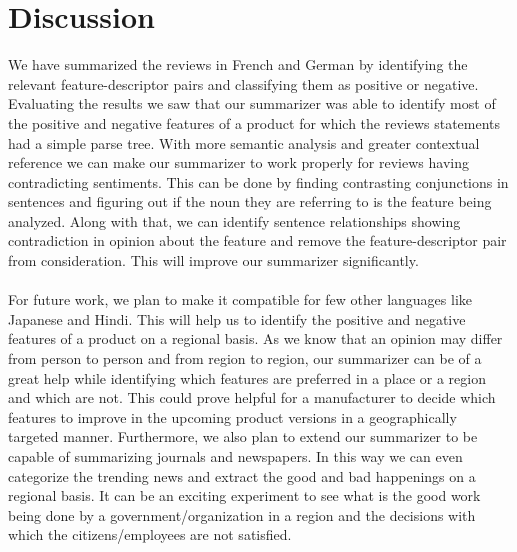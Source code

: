 \documentclass[conference]{IEEEtran}
\begin{document}
\section{\textbf{Discussion}}
\indent We have summarized the reviews in French and German by identifying the relevant feature-descriptor pairs and classifying them as positive or negative. Evaluating the results we saw that our summarizer was able to identify most of the positive and negative features of a product for which the reviews statements had a simple parse tree. With more semantic analysis and greater contextual reference we can make our summarizer to work properly for reviews having contradicting sentiments. This can be done by finding contrasting conjunctions in sentences and figuring out if the noun they are referring to is the feature being analyzed. Along with that, we can identify sentence relationships showing contradiction in opinion about the feature and remove the feature-descriptor pair from consideration. This will improve our summarizer significantly.\\\\
\indent For future work, we plan to make it compatible for few other languages like Japanese and Hindi. This will help us to identify the positive and negative features of a product on a regional basis. As we know that an opinion may differ from person to person and from region to region, our summarizer can be of a great help while identifying which features are preferred in a place or a region and which are not. This could prove helpful for a manufacturer to decide which features to improve in the upcoming product versions in a geographically targeted manner.
Furthermore, we also plan to extend our summarizer to be capable of summarizing journals and newspapers. In this way we can even categorize the trending news and extract the good and bad happenings on a regional basis. It can be an exciting experiment to see what is the good work being done by a government/organization in a region and the decisions with which the citizens/employees are not satisfied.\\
\end{document}
